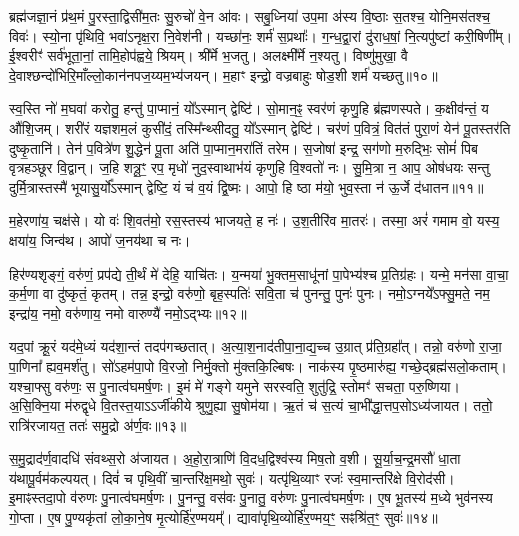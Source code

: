 ब्रह्म॑जज्ञा॒नं प्र॑थ॒मं पु॒रस्ता॒द्विसी॑म॒तः सु॒रुचो॑ वे॒न आ॑वः। 
सबु॒ध्निया॑ उप॒मा अ॑स्य वि॒ष्ठाः स॒तश्च॒ योनि॒मस॑तश्च॒ विवः॑। 
स्यो॒ना पृ॑थिवि॒ भवा॑ऽनृक्ष॒रा नि॒वेश॑नी। 
यच्छा॑नः॒ शर्म॑ स॒प्रथाः᳚। 
ग॒न्ध॒द्वा॒रां दु॑राध॒\ar{}षां॒ नि॒त्यपु॑ष्टां करी॒षिणी᳚म्। 
ई॒श्वरीꣳ॑ सर्व॑भूता॒नां॒ तामि॒होप॑ह्वये॒ श्रियम्। 
श्री᳚र्मे भ॒जतु। 
अलक्ष्मी᳚र्मे न॒श्यतु। 
विष्णु॑मुखा॒ वै दे॒वाश्छन्दो॑भिरि॒माँल्लो॒कान॑नप\-ज॒य्यम॒भ्य॑जयन्। 
म॒हाꣳ इन्द्रो॒ वज्रबाहुः षोड॒शी शर्म॑ यच्छतु॥१०॥

 स्व॒स्ति नो॑ म॒घवा॑ करोतु॒ हन्तु॑ पा॒प्मानं॒ यो᳚ऽस्मान् द्वेष्टि॑। 
 सो॒मान॒ꣴ॒ स्वर॑णं कृणु॒हि ब्र॑ह्मणस्पते। 
 क॒क्षीव॑न्तं॒ य औ॑शि॒जम्। 
 शरी॑रं यज्ञशम॒लं कुसी॑दं॒ तस्मि᳚न्थ्सीदतु॒ यो᳚ऽस्मान् द्वेष्टि॑। 
 चर॑णं प॒वित्रं॒ वित॑तं पुरा॒णं येन॑ पू॒तस्तर॑ति दुष्कृ॒तानि॑। 
 तेन॑ प॒वित्रे॑ण शु॒द्धेन॑ पू॒ता अति॑ पा॒प्मान॒मरा॑तिं तरेम। 
 स॒जोषा॑ इन्द्र॒ सग॑णो म॒रुद्भिः॒ सोमं॑ पिब वृत्रहञ्छूर वि॒द्वान्। 
 ज॒हि शत्रू॒ꣳ॒ रप॒ मृधो॑ नुद॒स्वाथाभ॑यं कृणुहि वि॒श्वतो॑ नः। 
 सु॒मि॒त्रा न॒ आप॒ ओष॑धयः सन्तु दुर्मि॒त्रास्तस्मै॑ भूयासु॒र्यो᳚ऽस्मान् द्वेष्टि॒ यं च॑ व॒यं द्वि॒ष्मः। 
 आपो॒ हि ष्ठा म॑यो॒ भुव॒स्ता न॑ ऊ॒र्जे द॑धातन॥११॥
 
 म॒हेरणा॑य॒ चक्ष॑से। 
 यो वः॑ शि॒वत॑मो॒ रस॒स्तस्य॑ भाजयते॒ ह नः॑। 
 उ॒श॒तीरि॑व मा॒तरः॑। 
 तस्मा॒ अरं॑ गमाम वो॒ यस्य॒ क्षया॑य॒ जिन्व॑थ। 
 आपो॑ ज॒नय॑था च नः।

 
हिर॑ण्यशृङ्गं॒ वरु॑णं॒ प्रप॑द्ये ती॒र्थं मे॑ देहि॒ याचि॑तः। 
य॒न्मया॑ भु॒क्तम॒साधू॑नां पा॒पेभ्य॑श्च प्र॒तिग्र॑हः। 
यन्मे॒ मन॑सा वा॒चा॒ क॒र्म॒णा वा दु॑ष्कृतं॒ कृतम्। 
तन्न॒ इन्द्रो॒ वरु॑णो॒ बृह॒स्पतिः॑ सवि॒ता च॑ पुनन्तु॒ पुनः॑ पुनः। 
नमो॒ऽग्नये᳚ऽफ्सु॒मते॒ नम॒ इन्द्रा॑य॒ नमो॒ वरु॑णाय॒ नमो वारुण्यै॑ नमो॒ऽद्भ्यः॥१२॥

 यद॒पां क्रू॒रं यद॑मे॒ध्यं यद॑शा॒न्तं तदप॑गच्छतात्। 
 अ॒त्या॒श॒नाद॑ती\-पा॒ना॒द्य॒च्च उ॒ग्रात् प्र॑ति॒ग्रहा᳚त्। 
 तन्नो॒ वरु॑णो रा॒जा॒ पा॒णिना᳚ ह्यव॒मर्\mbox{}श॑तु। 
 सो॑ऽहम॑पा॒पो वि॒रजो॒ निर्मु॒क्तो मु॑क्तकि॒ल्बिषः। 
 नाक॑स्य पृ॒ष्ठमारु॑ह्य॒ गच्छे॒द्ब्रह्म॑सलो॒कताम्। 
 यश्चा॒फ्सु वरु॑णः॒ स पु॒नात्व॑घमर्\mbox{}ष॒णः। 
 इ॒मं मे॑ गङ्गे यमुने सरस्वति॒ शुतु॑द्रि॒ स्तोमꣳ॑ सचता॒ परु॒ष्णिया। 
 अ॒सि॒क्नि॒या म॑रुद्\mbox{}वृधे वि॒तस्त॒याऽऽर्जी॑कीये श्रुणु॒ह्या सु॒षोम॑या। 
 ऋ॒तं च॑ स॒त्यं चा॒भी᳚द्धा॒त्तप॒सोऽध्य॑जायत। 
 ततो॒ रात्रि॑रजायत॒ ततः॑ समु॒द्रो अ॑र्ण॒वः॥१३॥
 
 स॒मु॒द्राद॑र्ण॒वादधि॑ संवथ्स॒रो अ॑जायत। 
 अ॒हो॒रा॒त्राणि॑ वि॒दध॒द्विश्व॑स्य मिष॒तो व॒शी। 
 सू॒र्या॒च॒न्द्र॒मसौ॑ धा॒ता य॑थापू॒र्वम॑कल्पयत्। 
 दिवं॑ च पृथि॒वीं चा॒न्तरि॑क्ष॒मथो॒ सुवः॑। 
 यत्पृ॑थि॒व्याꣳ रजः॑ स्व॒मान्तरि॑क्षे वि॒रोद॑सी। 
 इ॒माꣴस्तदा॒पो व॑रुणः पु॒नात्व॑घमर्\mbox{}ष॒णः। 
 पु॒नन्तु॒ वस॑वः पु॒नातु॒ वरु॑णः पु॒नात्व॑घमर्\mbox{}ष॒णः। 
 ए॒ष भू॒तस्य॑ म॒ध्ये भुव॑नस्य गो॒प्ता। 
 ए॒ष पु॒ण्यकृ॑तां लो॒का॒ने॒ष मृ॒त्योर्\mbox{}हि॑र॒ण्मयम्᳚। 
 द्यावा॑पृथि॒व्योर्\mbox{}हि॑र॒ण्मय॒ꣳ॒ सꣴश्रि॑त॒ꣳ॒ सुवः॑॥१४॥

